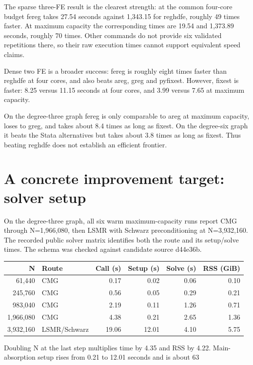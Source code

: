 \documentclass[11pt]{article}
\begin{document}
The sparse three-FE result is the clearest strength: at the common four-core budget fereg takes 27.54 seconds against 1,343.15 for reghdfe, roughly 49 times faster. At maximum capacity the corresponding times are 19.54 and 1,373.89 seconds, roughly 70 times. Other commands do not provide six validated repetitions there, so their raw execution times cannot support equivalent speed claims.

Dense two FE is a broader success: fereg is roughly eight times faster than reghdfe at four cores, and also beats areg, greg and pyfixest. However, fixest is faster: 8.25 versus 11.15 seconds at four cores, and 3.99 versus 7.65 at maximum capacity.

On the degree-three graph fereg is only comparable to areg at maximum capacity, loses to greg, and takes about 8.4 times as long as fixest. On the degree-six graph it beats the Stata alternatives but takes about 3.8 times as long as fixest. Thus beating reghdfe does not establish an efficient frontier.

\clearpage\section{A concrete improvement target: solver setup}

On the degree-three graph, all six warm maximum-capacity runs report CMG through N=1,966,080, then LSMR with Schwarz preconditioning at N=3,932,160. The recorded public solver matrix identifies both the route and its setup/solve times. The schema was checked against candidate source d44e36b.

\small\begin{longtable}{rlrrrr}
\toprule
N & Route & Call (s) & Setup (s) & Solve (s) & RSS (GiB)\\\midrule\endhead
61,440 & CMG & 0.17 & 0.02 & 0.06 & 0.10\\
245,760 & CMG & 0.56 & 0.05 & 0.29 & 0.21\\
983,040 & CMG & 2.19 & 0.11 & 1.26 & 0.71\\
1,966,080 & CMG & 4.38 & 0.21 & 2.65 & 1.36\\
3,932,160 & LSMR/Schwarz & 19.06 & 12.01 & 4.10 & 5.75\\
\bottomrule\end{longtable}\normalsize

Doubling N at the last step multiplies time by 4.35 and RSS by 4.22. Main-absorption setup rises from 0.21 to 12.01 seconds and is about 63%
\end{document}
